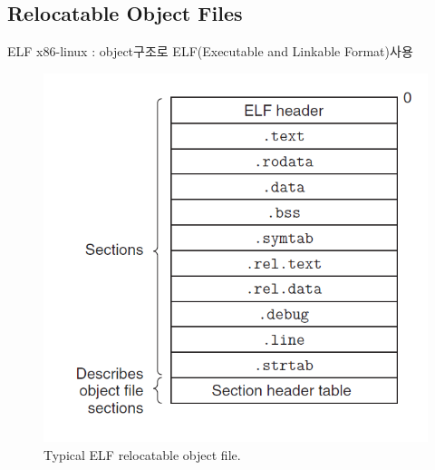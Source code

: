 \documentclass[10pt]{beamer}
\begin{document}
\subsection{Relocatable Object Files}

\begin{frame}{ELF}
    x86-linux : object구조로 ELF(Executable and Linkable Format)사용
    \begin{figure}[h!]
        \centering
        \includegraphics[scale=0.45]{pic/pic2.PNG}
        \caption{Typical ELF relocatable object file.}
    \end{figure}
\end{frame}    
\end{document}
